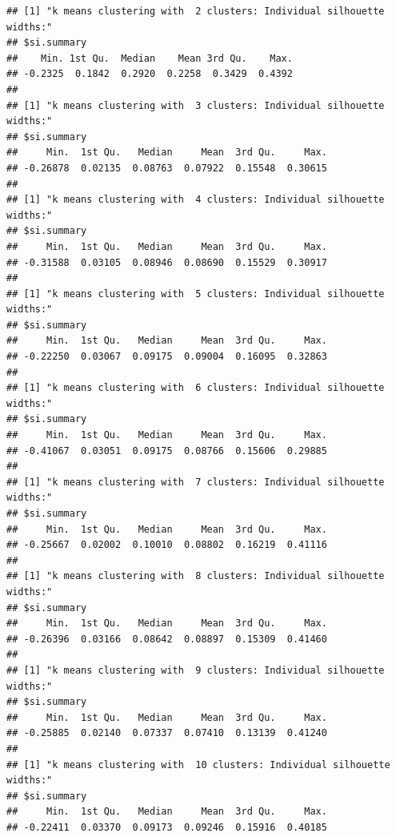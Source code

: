 \documentclass[
]{article}
\newenvironment{Shaded}{\begin{snugshade}}{\end{snugshade}}
\newcommand{\AttributeTok}[1]{\textcolor[rgb]{0.77,0.63,0.00}{#1}}
\newcommand{\ControlFlowTok}[1]{\textcolor[rgb]{0.13,0.29,0.53}{\textbf{#1}}}
\newcommand{\DecValTok}[1]{\textcolor[rgb]{0.00,0.00,0.81}{#1}}
\newcommand{\DocumentationTok}[1]{\textcolor[rgb]{0.56,0.35,0.01}{\textbf{\textit{#1}}}}
\newcommand{\FunctionTok}[1]{\textcolor[rgb]{0.00,0.00,0.00}{#1}}
\newcommand{\NormalTok}[1]{#1}
\newcommand{\OtherTok}[1]{\textcolor[rgb]{0.56,0.35,0.01}{#1}}
\newcommand{\SpecialCharTok}[1]{\textcolor[rgb]{0.00,0.00,0.00}{#1}}
\newcommand{\StringTok}[1]{\textcolor[rgb]{0.31,0.60,0.02}{#1}}
\begin{document}
\begin{Shaded}
\end{Shaded}

\begin{verbatim}
## [1] "k means clustering with  2 clusters: Individual silhouette widths:"
## $si.summary
##    Min. 1st Qu.  Median    Mean 3rd Qu.    Max. 
## -0.2325  0.1842  0.2920  0.2258  0.3429  0.4392 
## 
## [1] "k means clustering with  3 clusters: Individual silhouette widths:"
## $si.summary
##     Min.  1st Qu.   Median     Mean  3rd Qu.     Max. 
## -0.26878  0.02135  0.08763  0.07922  0.15548  0.30615 
## 
## [1] "k means clustering with  4 clusters: Individual silhouette widths:"
## $si.summary
##     Min.  1st Qu.   Median     Mean  3rd Qu.     Max. 
## -0.31588  0.03105  0.08946  0.08690  0.15529  0.30917 
## 
## [1] "k means clustering with  5 clusters: Individual silhouette widths:"
## $si.summary
##     Min.  1st Qu.   Median     Mean  3rd Qu.     Max. 
## -0.22250  0.03067  0.09175  0.09004  0.16095  0.32863 
## 
## [1] "k means clustering with  6 clusters: Individual silhouette widths:"
## $si.summary
##     Min.  1st Qu.   Median     Mean  3rd Qu.     Max. 
## -0.41067  0.03051  0.09175  0.08766  0.15606  0.29885 
## 
## [1] "k means clustering with  7 clusters: Individual silhouette widths:"
## $si.summary
##     Min.  1st Qu.   Median     Mean  3rd Qu.     Max. 
## -0.25667  0.02002  0.10010  0.08802  0.16219  0.41116 
## 
## [1] "k means clustering with  8 clusters: Individual silhouette widths:"
## $si.summary
##     Min.  1st Qu.   Median     Mean  3rd Qu.     Max. 
## -0.26396  0.03166  0.08642  0.08897  0.15309  0.41460 
## 
## [1] "k means clustering with  9 clusters: Individual silhouette widths:"
## $si.summary
##     Min.  1st Qu.   Median     Mean  3rd Qu.     Max. 
## -0.25885  0.02140  0.07337  0.07410  0.13139  0.41240 
## 
## [1] "k means clustering with  10 clusters: Individual silhouette widths:"
## $si.summary
##     Min.  1st Qu.   Median     Mean  3rd Qu.     Max. 
## -0.22411  0.03370  0.09173  0.09246  0.15916  0.40185
\end{verbatim}
\end{document}
